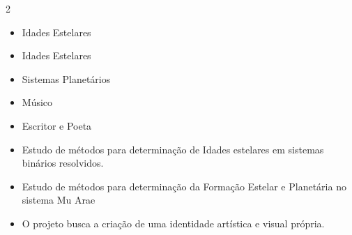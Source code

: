 \documentclass[10pt,a4paper,withhyper]{altacv}
\begin{document}
\begin{paracol}{2}

\begin{itemize}
\item Idades Estelares
\end{itemize}

\divider

\begin{itemize}
\item Idades Estelares
\end{itemize}

\divider

\begin{itemize}
\item Sistemas Planetários
\end{itemize}

\divider

\begin{itemize}
\item Músico
\item Escritor e Poeta
\end{itemize}


\begin{itemize}
\item Estudo de métodos para determinação de Idades estelares em sistemas binários resolvidos.
\end{itemize}

\divider

\begin{itemize}
\item Estudo de métodos para determinação da Formação Estelar e Planetária no sistema Mu Arae
\end{itemize}

\divider

\begin{itemize}
\item O projeto busca a criação de uma identidade artística e visual própria.
\end{itemize}



\end{paracol}
\end{document}
